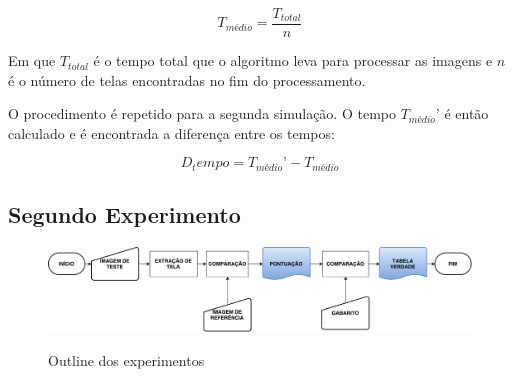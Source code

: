 \begin{equation}
T_{médio} = \frac{T_{total}}{n}
\end{equation}

Em que $T_{total}$ é o tempo total que o algoritmo leva para processar as imagens e $n$ é o número de telas encontradas no fim do processamento.

O procedimento é repetido para a segunda simulação. O tempo $T_{médio}’$ é então calculado e é encontrada a diferença entre os tempos:

\begin{equation}
D_tempo = T_{médio}’ - T_{médio}
\end{equation}



\subsection{Segundo Experimento}

\begin{figure} [h]
\centering
\includegraphics[width = \textwidth]{figuras/experimento_template.pdf} \label{exptemplate} \caption{Outline dos experimentos}
\end{figure} 

